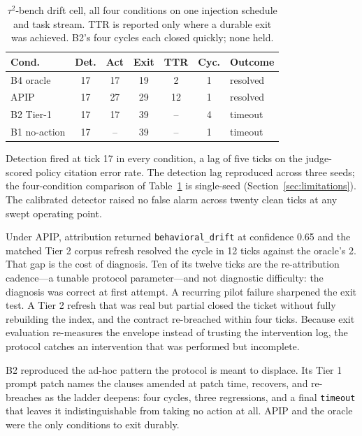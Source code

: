 \documentclass[conference]{IEEEtran}
\newcommand{\code}[1]{\texttt{\small #1}}
\begin{document}
\begin{table}[t]
\caption{$\tau^2$-bench drift cell, all four conditions on one injection
schedule and task stream. TTR is reported only where a durable exit was
achieved. B2's four cycles each closed quickly; none held.}
\label{tab:baselines}
\centering
\footnotesize
\begin{tabular}{@{}lcccccl@{}}
\toprule
\textbf{Cond.} & \textbf{Det.} & \textbf{Act} & \textbf{Exit} & \textbf{TTR} &
\textbf{Cyc.} & \textbf{Outcome} \\
\midrule
B4 oracle      & 17 & 17   & 19 & 2  & 1 & resolved \\
APIP           & 17 & 27   & 29 & 12 & 1 & resolved \\
B2 Tier-1      & 17 & 17   & 39 & -- & 4 & timeout \\
B1 no-action   & 17 & --   & 39 & -- & 1 & timeout \\
\bottomrule
\end{tabular}
\end{table}

Detection fired at tick 17 in every condition, a lag of five ticks on the
judge-scored policy citation error rate. The detection lag reproduced across
three seeds; the four-condition comparison of Table~\ref{tab:baselines} is
single-seed (Section~\ref{sec:limitations}). The calibrated detector raised no
false alarm across twenty clean ticks at any swept operating point.

Under APIP, attribution returned \code{behavioral\_drift} at confidence 0.65
and the matched Tier 2 corpus refresh resolved the cycle in 12 ticks against
the oracle's 2. That gap is the cost of diagnosis. Ten of its twelve ticks are
the re-attribution cadence---a tunable protocol parameter---and not diagnostic
difficulty: the diagnosis was correct at first attempt. A recurring pilot
failure sharpened the exit test. A Tier 2 refresh that was real but partial
closed the ticket without fully rebuilding the index, and the contract
re-breached within four ticks. Because exit evaluation re-measures the envelope
instead of trusting the intervention log, the protocol catches an intervention
that was performed but incomplete.

B2 reproduced the ad-hoc pattern the protocol is meant to displace. Its Tier 1
prompt patch names the clauses amended at patch time, recovers, and re-breaches
as the ladder deepens: four cycles, three regressions, and a final
\code{timeout} that leaves it indistinguishable from taking no action at all.
APIP and the oracle were the only conditions to exit durably.
\end{document}

